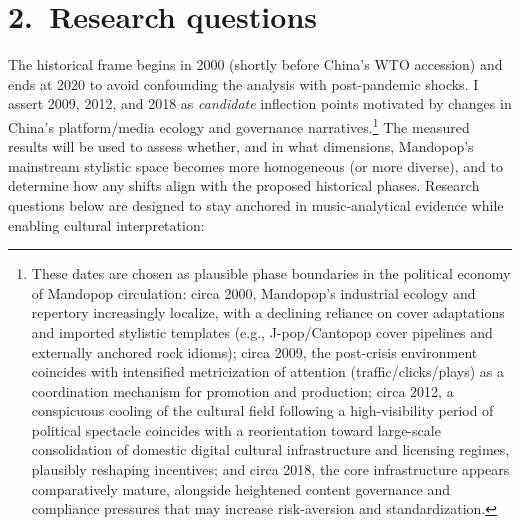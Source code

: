 \documentclass[11pt]{article}
\begin{document}

\section*{2.\ Research questions}

The historical frame begins in 2000 (shortly before China’s WTO accession) and ends at 2020 to avoid confounding the analysis with post-pandemic shocks. I assert 2009, 2012, and 2018 as \emph{candidate} inflection points motivated by changes in China’s platform/media ecology and governance narratives.\footnote{These dates are chosen as plausible phase boundaries in the political economy of Mandopop circulation: circa 2000, Mandopop’s industrial ecology and repertory increasingly localize, with a declining reliance on cover adaptations and imported stylistic templates (e.g., J-pop/Cantopop cover pipelines and externally anchored rock idioms); circa 2009, the post-crisis environment coincides with intensified metricization of attention (traffic/clicks/plays) as a coordination mechanism for promotion and production; circa 2012, a conspicuous cooling of the cultural field following a high-visibility period of political spectacle coincides with a reorientation toward large-scale consolidation of domestic digital cultural infrastructure and licensing regimes, plausibly reshaping incentives; and circa 2018, the core infrastructure appears comparatively mature, alongside heightened content governance and compliance pressures that may increase risk-aversion and standardization.} %
The measured results will be used to assess whether, and in what dimensions, Mandopop’s mainstream stylistic space becomes more homogeneous (or more diverse), and to determine how any shifts align with the proposed historical phases. Research questions below are designed to stay anchored in music-analytical evidence while enabling cultural interpretation:
\end{document}
